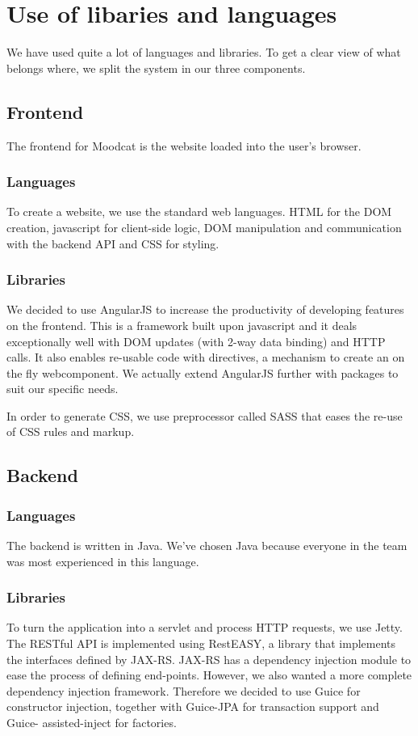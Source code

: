 \section{Use of libaries and languages}
We have used quite a lot of languages and libraries.
To get a clear view of what belongs where, we split the system in our three components.

\subsection{Frontend}
The frontend for Moodcat is the website loaded into the user's browser.

\subsubsection{Languages}
To create a website, we use the standard web languages.
HTML for the DOM creation, javascript for client-side logic, DOM manipulation and communication with the backend API and CSS for styling.

\subsubsection{Libraries}
We decided to use AngularJS to increase the productivity of developing features on the frontend.
This is a framework built upon javascript and it deals exceptionally well with DOM updates (with 2-way data binding) and HTTP calls.
It also enables re-usable code with directives, a mechanism to create an on the fly webcomponent.
We actually extend AngularJS further with packages to suit our specific needs.

In order to generate CSS, we use preprocessor called SASS that eases the re-use of CSS rules and markup.

\subsection{Backend}

\subsubsection{Languages}
The backend is written in Java.
We've chosen Java because everyone in the team was most experienced in this language.

\subsubsection{Libraries}
To turn the application into a servlet and process HTTP requests, we use Jetty.
The RESTful API is implemented using RestEASY, a library that implements the interfaces defined by JAX-RS.
JAX-RS has a dependency injection module to ease the process of defining end-points.
However, we also wanted a more complete dependency injection framework.
Therefore we decided to use Guice for constructor injection, together with Guice-JPA for transaction support and Guice- assisted-inject for factories.

